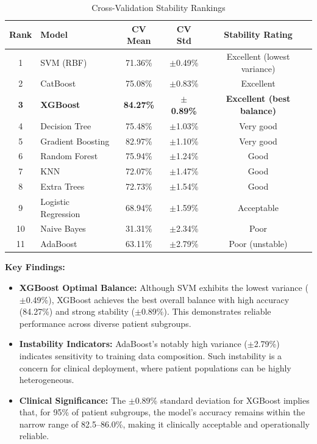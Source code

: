 \documentclass[3p,times,procedia]{elsarticle}
\begin{document}
\begin{table}[!ht]
\centering
\caption{Cross-Validation Stability Rankings}
\small
\begin{tabular}{|c|l|c|c|c|}
\hline
\rowcolor{gray!20}
\textbf{Rank} & \textbf{Model} & \textbf{CV Mean} & \textbf{CV Std} & \textbf{Stability Rating} \\
\hline
1 & SVM (RBF) & 71.36\% & $\pm$0.49\% & Excellent (lowest variance) \\
\rowcolor{gray!10}
2 & CatBoost & 75.08\% & $\pm$0.83\% & Excellent \\
\textbf{3} & \textbf{XGBoost} & \textbf{84.27\%} & \textbf{$\pm$0.89\%} & \textbf{Excellent (best balance)} \\
\rowcolor{gray!10}
4 & Decision Tree & 75.48\% & $\pm$1.03\% & Very good \\
5 & Gradient Boosting & 82.97\% & $\pm$1.10\% & Very good \\
\rowcolor{gray!10}
6 & Random Forest & 75.94\% & $\pm$1.24\% & Good \\
7 & KNN & 72.07\% & $\pm$1.47\% & Good \\
\rowcolor{gray!10}
8 & Extra Trees & 72.73\% & $\pm$1.54\% & Good \\
9 & Logistic Regression & 68.94\% & $\pm$1.59\% & Acceptable \\
\rowcolor{gray!10}
10 & Naive Bayes & 31.31\% & $\pm$2.34\% & Poor \\
11 & AdaBoost & 63.11\% & $\pm$2.79\% & Poor (unstable) \\
\hline
\end{tabular}
\end{table}


\textbf{Key Findings:}
\begin{itemize}
    \item \textbf{XGBoost Optimal Balance:} Although SVM exhibits the lowest variance ($\pm$0.49\%), XGBoost achieves the best overall balance with high accuracy (84.27\%) and strong stability ($\pm$0.89\%). This demonstrates reliable performance across diverse patient subgroups.

    \item \textbf{Instability Indicators:} AdaBoost's notably high variance ($\pm$2.79\%) indicates sensitivity to training data composition. Such instability is a concern for clinical deployment, where patient populations can be highly heterogeneous.

    \item \textbf{Clinical Significance:} The $\pm$0.89\% standard deviation for XGBoost implies that, for 95\% of patient subgroups, the model's accuracy remains within the narrow range of 82.5--86.0\%, making it clinically acceptable and operationally reliable.
\end{itemize}
\end{document}
